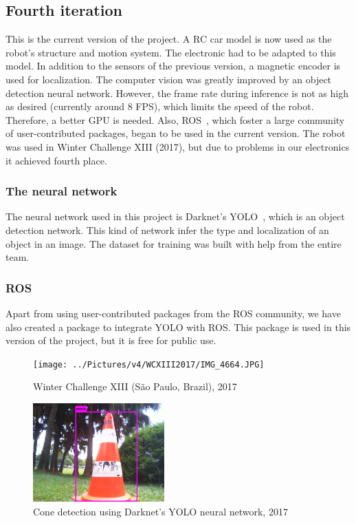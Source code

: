 \documentclass[conference]{IEEEtran}
\begin{document}


\subsection{Fourth iteration}
This is the current version of the project. A RC car model is now used as the robot's
structure and motion system. The electronic had to be adapted to this model.
In addition to the sensors of the previous version, a magnetic encoder is used for
localization. The computer vision was greatly improved by an object detection neural network.
However, the frame rate during inference is not as high as desired (currently around 8 FPS),
which limits the speed of the robot. Therefore, a better GPU is needed. Also, ROS~\cite{ROS},
which foster a large community of user-contributed packages, began to be used in the current
version.
The robot was used in Winter Challenge XIII (2017), but due to problems in our electronics
it achieved fourth place.
\setcounter{subsubsection}{0}
\subsubsection{The neural network}
The neural network used in this project is Darknet's YOLO~\cite{YOLO}, which is an object
detection network. This kind of network infer the type and localization of an object in an
image. The dataset for training was built with help from the entire team.
\subsubsection{ROS}
Apart from using user-contributed packages from the ROS community, we have also created a
package to integrate YOLO with ROS. This package is used in this version of the project,
but it is free for public use.

\begin{figure}[H]
   \centering
   \texttt{[image: ../Pictures/v4/WCXIII2017/IMG\_4664.JPG]}
   \caption{Winter Challenge XIII (São Paulo, Brazil), 2017}
\end{figure}

\begin{figure}[H]
   \centering
   \includegraphics[width=0.45\textwidth]{../Pictures/v4/WCXIII2017/predictions.png}
   \caption{Cone detection using Darknet's YOLO neural network, 2017}
\end{figure}
\end{document}
